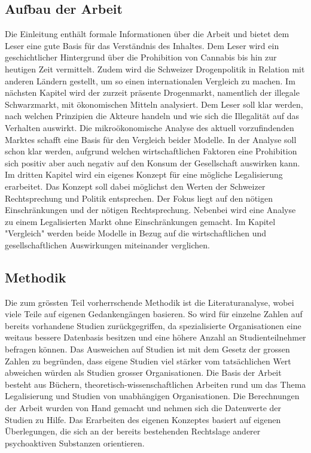 \documentclass[../main.tex]{subfiles}
\begin{document}
	 \subsection{Aufbau der Arbeit}
	 Die Einleitung enthält formale Informationen über die Arbeit und bietet dem Leser eine gute Basis für das Verständnis des Inhaltes. 
	 Dem Leser wird ein geschichtlicher Hintergrund über die Prohibition von Cannabis bis hin zur heutigen Zeit vermittelt. 
	 Zudem wird die Schweizer Drogenpolitik in Relation mit anderen Ländern gestellt, um so einen internationalen Vergleich zu machen.
	 Im nächsten Kapitel wird der zurzeit präsente Drogenmarkt, namentlich der illegale Schwarzmarkt, mit ökonomischen Mitteln analysiert. 
	 Dem Leser soll klar werden, nach welchen Prinzipien die Akteure handeln und wie sich die Illegalität auf das Verhalten auswirkt.
	 Die mikroökonomische Analyse des aktuell vorzufindenden Marktes schafft eine Basis für den Vergleich beider Modelle.
	 In der Analyse soll schon klar werden, aufgrund welchen wirtschaftlichen Faktoren eine Prohibition sich positiv aber auch negativ auf den Konsum der Gesellschaft auswirken kann. 
	 Im dritten Kapitel wird ein eigenes Konzept für eine mögliche Legalisierung erarbeitet. 
	 Das Konzept soll dabei möglichst den Werten der Schweizer Rechtsprechung und Politik entsprechen.
	 Der Fokus liegt auf den nötigen Einschränkungen und der nötigen Rechtsprechung.
	 Nebenbei wird eine Analyse zu einem Legalisierten Markt ohne Einschränkungen gemacht.
	 Im Kapitel "Vergleich" werden beide Modelle in Bezug auf die wirtschaftlichen und gesellschaftlichen Auswirkungen miteinander verglichen. 
	 
	 
	 
	 \subsection{Methodik}
	 Die zum grössten Teil vorherrschende Methodik ist die Literaturanalyse, wobei viele Teile auf eigenen Gedankengängen basieren. 
	 So wird für einzelne Zahlen auf bereits vorhandene Studien zurückgegriffen, da spezialisierte Organisationen eine weitaus bessere Datenbasis besitzen und eine höhere Anzahl an Studienteilnehmer befragen können. 
	 Das Ausweichen auf Studien ist mit dem Gesetz der grossen Zahlen zu begründen, dass eigene Studien viel stärker vom tatsächlichen Wert abweichen würden als Studien grosser Organisationen.
	 Die Basis der Arbeit besteht aus Büchern, theoretisch-wissenschaftlichen Arbeiten rund um das Thema Legalisierung und Studien von unabhängigen Organisationen.
	 Die Berechnungen der Arbeit wurden von Hand gemacht und nehmen sich die Datenwerte der Studien zu Hilfe.
	 Das Erarbeiten des eigenen Konzeptes basiert auf eigenen Überlegungen, die sich an der bereits bestehenden Rechtslage anderer psychoaktiven Substanzen orientieren.
	 
\end{document}
